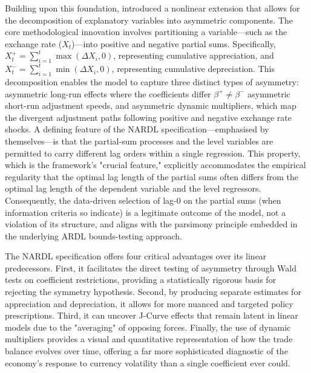 \documentclass[12pt]{article}
\begin{document}
Building upon this foundation, \textcite{Shin2014-ap} introduced a nonlinear extension that allows for the decomposition of explanatory variables into asymmetric components. The core methodological innovation involves partitioning a variable—such as the exchange rate ($X_t$)—into positive and negative partial sums. Specifically, $X_t^{+} = \sum_{i=1}^{t} \max(\Delta X_i, 0)$, representing cumulative appreciation, and $X_t^{-} = \sum_{i=1}^{t} \min(\Delta X_i, 0)$, representing cumulative depreciation. This decomposition enables the model to capture three distinct types of asymmetry: asymmetric long-run effects where the coefficients differ $\beta^{+} \neq \beta^{-}$ asymmetric short-run adjustment speeds, and asymmetric dynamic multipliers, which map the divergent adjustment paths following positive and negative exchange rate shocks. A defining feature of the NARDL specification—emphasised by \textcite{Shin2014-ap} themselves—is that the partial-sum processes and the level variables are permitted to carry different lag orders within a single regression. This property, which is the framework's "crucial feature," explicitly accommodates the empirical regularity that the optimal lag length of the partial sums often differs from the optimal lag length of the dependent variable and the level regressors. Consequently, the data-driven selection of lag-0 on the partial sums (when information criteria so indicate) is a legitimate outcome of the model, not a violation of its structure, and aligns with the parsimony principle embedded in the underlying ARDL bounds-testing approach.

The NARDL specification offers four critical advantages over its linear predecessors. First, it facilitates the direct testing of asymmetry through Wald tests on coefficient restrictions, providing a statistically rigorous basis for rejecting the symmetry hypothesis. Second, by producing separate estimates for appreciation and depreciation, it allows for more nuanced and targeted policy prescriptions. Third, it can uncover J-Curve effects that remain latent in linear models due to the "averaging" of opposing forces. Finally, the use of dynamic multipliers provides a visual and quantitative representation of how the trade balance evolves over time, offering a far more sophisticated diagnostic of the economy's response to currency volatility than a single coefficient ever could.
\end{document}
